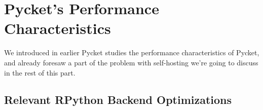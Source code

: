     \section{Pycket's Performance Characteristics}
        \begin{mainpoint}
            We introduced in earlier Pycket studies the performance characteristics of Pycket, and already foresaw a part of the problem with self-hosting we're going to discuss in the rest of this part.
        \end{mainpoint}

        \begin{paragraph-here}

        \end{paragraph-here}

        \subsection{Relevant RPython Backend Optimizations}


